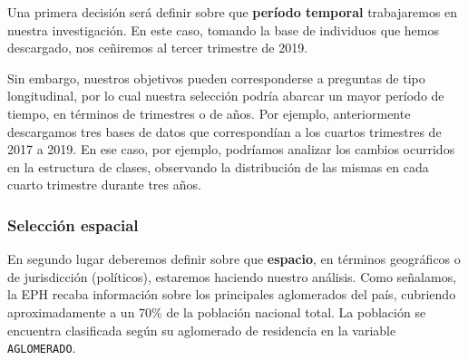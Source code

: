 \documentclass[
]{book}
\newenvironment{Shaded}{\begin{snugshade}}{\end{snugshade}}
\newcommand{\FunctionTok}[1]{\textcolor[rgb]{0.00,0.00,0.00}{#1}}
\newcommand{\NormalTok}[1]{#1}
\newcommand{\SpecialCharTok}[1]{\textcolor[rgb]{0.00,0.00,0.00}{#1}}
\begin{document}
Una primera decisión será definir sobre que \textbf{período temporal} trabajaremos en nuestra investigación. En este caso, tomando la base de individuos que hemos descargado, nos ceñiremos al tercer trimestre de 2019.

Sin embargo, nuestros objetivos pueden corresponderse a preguntas de tipo longitudinal, por lo cual nuestra selección podría abarcar un mayor período de tiempo, en términos de trimestres o de años. Por ejemplo, anteriormente descargamos tres bases de datos que correspondían a los cuartos trimestres de 2017 a 2019. En ese caso, por ejemplo, podríamos analizar los cambios ocurridos en la estructura de clases, observando la distribución de las mismas en cada cuarto trimestre durante tres años.

\hypertarget{selecciuxf3n-espacial}{%
\subsubsection{Selección espacial}\label{selecciuxf3n-espacial}}

En segundo lugar deberemos definir sobre que \textbf{espacio}, en términos geográficos o de jurisdicción (políticos), estaremos haciendo nuestro análisis. Como señalamos, la EPH recaba información sobre los principales aglomerados del país, cubriendo aproximadamente a un 70\% de la población nacional total. La población se encuentra clasificada según su aglomerado de residencia en la variable \texttt{AGLOMERADO}.

\begin{Shaded}
\end{Shaded}
\end{document}
